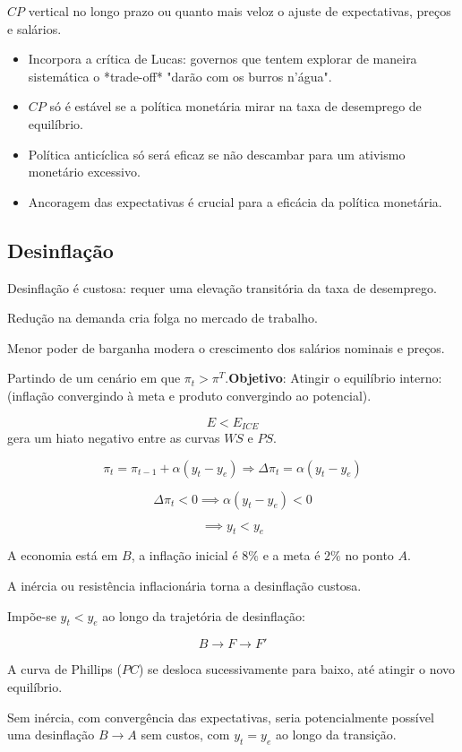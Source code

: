 \documentclass[a4paper,12pt]{article}[abntex2]
\begin{document}
\( CP \) vertical no longo prazo ou quanto mais veloz o ajuste de expectativas, preços e salários. \begin{itemize}
    \item Incorpora a crítica de Lucas: governos que tentem explorar de maneira sistemática o *trade-off* "darão com os burros n'água".
    \item \( CP \) só é estável se a política monetária mirar na taxa de desemprego de equilíbrio.
    \item Política anticíclica só será eficaz se não descambar para um ativismo monetário excessivo.
    \item Ancoragem das expectativas é crucial para a eficácia da política monetária.
\end{itemize}

\subsection{\textbf{Desinflação}}

Desinflação é custosa: requer uma elevação transitória da taxa de desemprego.

Redução na demanda cria folga no mercado de trabalho.

Menor poder de barganha modera o crescimento dos salários nominais e preços.

Partindo de um cenário em que \(\pi_t>\pi^T\).\textbf{Objetivo}:  Atingir  o  equilíbrio  interno:  (inflação  convergindo  à  meta  e  produto convergindo ao potencial). 


\[
E < E_{ICE}
\]
gera um hiato negativo entre as curvas \( WS \) e \( PS \).

\[
\pi_t = \pi_{t-1} + \alpha (y_t - y_e) \Rightarrow \Delta \pi_t = \alpha (y_t - y_e)
\]

\[
\Delta \pi_t < 0 \implies \alpha (y_t - y_e) < 0
\]

\[
\implies y_t < y_e
\]

A economia está em \( B \), a inflação inicial é \( 8\% \) e a meta é \( 2\% \) no ponto \( A \).

A inércia ou resistência inflacionária torna a desinflação custosa.

Impõe-se \( y_t < y_e \) ao longo da trajetória de desinflação: 

\[
B \to F \to F'
\]

A curva de Phillips (\( PC \)) se desloca sucessivamente para baixo, até atingir o novo equilíbrio.

Sem inércia, com convergência das expectativas, seria potencialmente possível uma desinflação \( B \to A \) sem custos, com \( y_t = y_e \) ao longo da transição.
\end{document}
